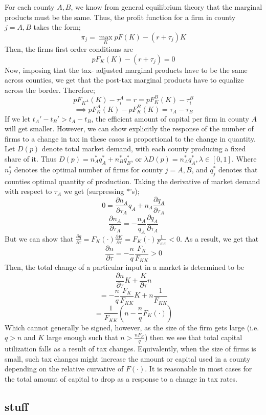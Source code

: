 \documentclass{article}
\begin{document}
For each county $A,B$, we know from general equilibrium theory that the marginal products must be the same. Thus, the profit function for a firm in county $j = A,B$ takes the form;
$$\pi_{j} = \max_{K} pF(K)-(r+\tau_{j})K$$
Then, the firms first order conditions are
$$pF_{K}(K)-(r+\tau_{j}) = 0$$
Now, imposing that the tax- adjusted marginal products have to be the same across counties, we get that the post-tax marginal products have to equalize across the border. Therefore;
$$pF_{K^{A}}(K)-\tau_{i}^{A} = r = pF_{K}^{B}(K)-\tau_{i}^{B}$$
$$\implies pF_{K}^{A}(K)- pF_{K}^{B}(K) = \tau_{A}-\tau_{B}$$
If we let $t_{A}'-t_{B}' > t_{A}-t_{B}$, the efficient amount of capital per firm in county $A$ will get smaller. However, we can show explicitly the response of the number of firms to a change in tax in these cases is proportional to the change in quantity. Let $D(p)$ denote total market demand, with each county producing a fixed share of it. Thus $D(p) = n_{A}^{*}q_{A}^{*}+n_{B}^{*}q_{B}^{*}$, or $\lambda D(p) = n_{A}^{*}q_{A}^{*}, \lambda \in [0,1]$. Where $n_{j}^{*}$ denotes the optimal number of firms for county $j = A,B$, and $q_{j}^{*}$ denotes that counties optimal quantity of production. Taking the derivative of market demand with respect to $\tau_{A}$ we get (surpressing $*$'s);
$$0 = \frac{\partial n_{A}}{\partial \tau_{A}}q_{A}+ n_{A}\frac{\partial q_{A}}{\partial \tau_{A}}$$
$$\frac{\partial n_{A}}{\partial \tau_{A}} = -\frac{n_{A}}{q_{A}}\frac{\partial q_{A}}{\partial \tau_{A}}$$
But we can show that $\frac{\partial q}{\partial \tau} = F_{K}(\cdot)\frac{\partial K}{\partial \tau} =  F_{K}(\cdot)\frac{1}{F_{KK}} < 0$. As a result, we get that
$$\frac{\partial n}{\partial \tau} = -\frac{n}{q}\frac{F_{K}}{F_{KK}} > 0$$
Then, the total change of a particular input in a market is determined to be
$$\frac{\partial n}{\partial \tau}K+\frac{K}{\partial \tau}n$$
$$= -\frac{n}{q}\frac{F_{K}}{F_{KK}}K+n\frac{1}{F_{KK}}$$
$$=\frac{1}{F_{KK}}(n-\frac{n}{q}F_{K}(\cdot))$$
Which cannot generally be signed, however, as the size of the firm gets large (i.e. $q > n$ and $K$ large enough such that $n > \frac{nF_{K}}{q}$) then we see that total capital utilization falls as a result of tax changes. Equivalently, when the size of firms is small, such tax changes might increase the amount or capital used in a county depending on the relative curvative of $F(\cdot)$. It is reasonable in most cases for the total amount of capital to drop as a response to a change in tax rates.

\subsection{stuff}
\end{document}
